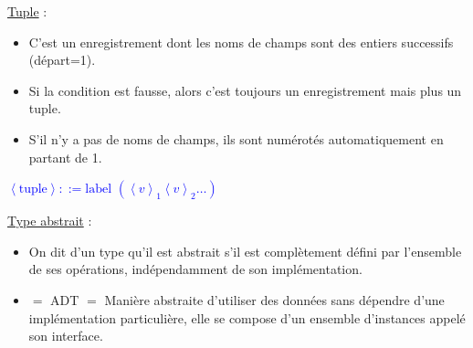 \documentclass[fr,license=none,skiptoc]{../../../eplsummary}
\begin{document}
\begin{flushleft}
\textcolor{mauvedef}{\underline{Tuple}} : 

\begin{itemize}
\item C'est un enregistrement dont les noms de champs sont des entiers successifs (départ=1).
\item Si la condition est fausse, alors c'est toujours un enregistrement mais plus un tuple.
\item S'il n'y a pas de noms de champs, ils sont numérotés automatiquement en partant de 1.
\end{itemize}

\begin{center}
\textcolor{blue}{$\left\langle \text{tuple} \right\rangle ::=  \text{label }  ( \left\langle v \right\rangle_1  \left\langle v \right\rangle_2 \ldots ) $}
\end{center}

\bigbreak


\textcolor{mauvedef}{\underline{Type abstrait}} :

\begin{itemize}
\item On dit d'un type qu'il est abstrait s'il est complètement défini par l'ensemble de ses opérations, indépendamment de son implémentation.
\item $=$ ADT $=$ Manière abstraite d'utiliser des données sans dépendre d'une implémentation particulière, elle se compose d'un ensemble d'instances appelé son interface.
\end{itemize}\bigbreak

\end{flushleft}
\end{document}

